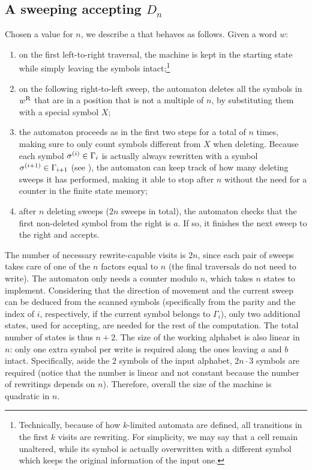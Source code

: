 \subsection{A sweeping \kDLA accepting \texorpdfstring{$D_n$}{Ln}}
Chosen a value for $n$, we describe a  that behaves as follows. Given a word $w$:
\begin{enumerate}
	\item on the first left-to-right traversal, the machine is kept in the starting state while simply leaving the symbols intact;\footnote{%
		      Technically, because of how $k$-limited automata are defined, all transitions in the first $k$ visits are rewriting. For simplicity, we may say that a cell remain unaltered, while its symbol is actually overwritten with a different symbol which keeps the original information of the input one.}
	\item on the following right-to-left sweep, the automaton deletes all the symbols in $w^{\mathrm R}$ that are in a position that is not a multiple of $n$, by substituting them with a special symbol $X$;
	\item the automaton proceeds as in the first two steps for a total of $n$ times, making sure to only count symbols different from $X$ when deleting.
	      Because each symbol $\sigma^{(i)}\in\Gamma_i$ is actually always rewritten with a symbol $\sigma^{(i+1)}\in\Gamma_{i+1}$ (see ), the automaton can keep track of how many deleting sweeps it has performed, making it able to stop after $n$ without the need for a counter in the finite state memory;
	\item after $n$ deleting sweeps ($2n$ sweeps in total), the automaton checks that the first non-deleted symbol from the right is $a$.
	      If so, it finishes the next sweep to the right and accepts.
\end{enumerate}
The number of necessary rewrite-capable visits is $2n$, since each pair of sweeps takes care of one of the $n$ factors equal to $n$ (the final traversals do not need to write).
The automaton only needs a counter modulo $n$, which takes $n$ states to implement.
Considering that the direction of movement and the current sweep can be deduced from the scanned symbols (specifically from the parity and the index of $i$, respectively, if the current symbol belongs to $\Gamma_i$), only two additional states, used for accepting, are needed for the rest of the computation.
The total number of states is thus $n+2$.
The size of the working alphabet is also linear in $n$: only one extra symbol per write is required along the ones leaving $a$ and $b$ intact.
Specifically, aside the $2$ symbols of the input alphabet, $2n\cdot3$ symbols are required (notice that the number is linear and not constant because the number of rewritings depends on $n$).
Therefore, overall the size of the machine is quadratic in $n$.

